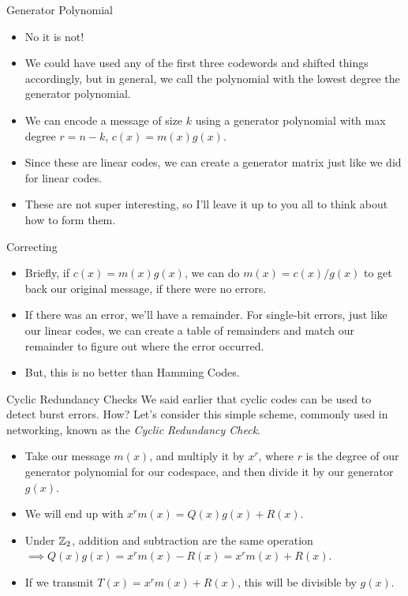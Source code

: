 \documentclass[aspectratio=169]{beamer}
\begin{document}
\begin{frame}{Generator Polynomial}
    \begin{itemize}
        \item No it is not! 
        \item We could have used any of the first three codewords and shifted things accordingly, but in general, we call the polynomial with the lowest degree the generator polynomial. \pause 
        \item We can encode a message of size $k$ using a generator polynomial with max degree $r = n - k$, $c(x) = m(x)g(x)$. \pause 
        \item Since these are linear codes, we can create a generator matrix just like we did for linear codes. 
        \item These are not super interesting, so I'll leave it up to you all to think about how to form them. 
    \end{itemize}
\end{frame}

\begin{frame}{Correcting}
    \begin{itemize}
        \item Briefly, if $c(x) = m(x)g(x)$, we can do $m(x) = c(x)/g(x)$ to get back our original message, if there were no errors. 
        \item If there was an error, we'll have a remainder. For single-bit errors, just like our linear codes, we can create a table of remainders and match our remainder to figure out where the error occurred. 
        \item But, this is no better than Hamming Codes.
    \end{itemize}
     
\end{frame}

\begin{frame}{Cyclic Redundancy Checks}
    We said earlier that cyclic codes can be used to detect burst errors. How? \pause Let's consider this simple scheme, commonly used in networking, known as the \emph{Cyclic Redundancy Check}. 

    \begin{itemize}
        \item Take our message $m(x)$, and multiply it by $x^r$, where $r$ is the degree of our generator polynomial for our codespace, and then divide it by our generator $g(x)$. \pause
        \item We will end up with $x^rm(x) = Q(x)g(x) + R(x)$. \pause
        \item Under $\mathbb{Z}_2$, addition and subtraction are the same operation $\implies Q(x)g(x) = x^r m(x) - R(x) = x^r m(x) + R(x)$.
        \item If we transmit $T(x) = x^rm(x) + R(x)$, this will be divisible by $g(x)$. 
    \end{itemize}
\end{frame}
\end{document}
